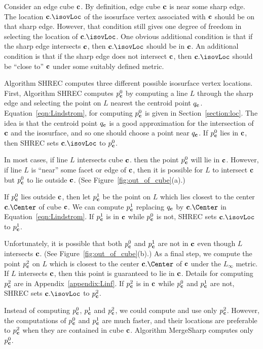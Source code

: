 Consider an edge cube $\mathbf{c}$.
By definition, edge cube $\mathbf{c}$ is near some sharp edge.
The location $\cb.\isovLoc$ of the isosurface vertex associated with $\mathbf{c}$ 
should be on that sharp edge.
However, that condition still gives one degree of freedom in selecting
the location of $\cb.\isovLoc$.
One obvious additional condition is that if the sharp edge intersects $\mathbf{c}$,
then $\cb.\isovLoc$ should be in $\mathbf{c}$.
An additional condition is that if the sharp edge does not intersect $\mathbf{c}$,
then $\cb.\isovLoc$ should be ``close to'' $\mathbf{c}$ 
under some suitably defined metric.

Algorithm SHREC computes three different possible isosurface vertex locations.
First, Algorithm SHREC computes $p^0_{\mathbf{c}}$ 
by computing a line $L$ through the sharp edge and 
selecting the point on $L$ nearest the centroid point $q_{\mathbf{c}}$.
Equation~\ref{eqn:Lindstrom}, for computing $p^0_{\mathbf{c}}$ is given
in Section~\ref{section:loc}.
The idea is that the centroid point $q_{\mathbf{c}}$ is a good approximation
for the intersection of $\mathbf{c}$ and the isosurface,
and so one should choose a point near $q_{\mathbf{c}}$.
If $p^0_{\mathbf{c}}$ lies in $\mathbf{c}$, then SHREC sets $\cb.\isovLoc$ to $p^0_{\mathbf{c}}$.

In most cases, if line $L$ intersects cube $\mathbf{c}$.
then the point $p^0_{\mathbf{c}}$ will lie in $\mathbf{c}$.
However, if line $L$ is ``near'' some facet or edge of $\mathbf{c}$,
then it is possible for $L$ to intersect $\mathbf{c}$ but $p^0_{\mathbf{c}}$ to lie
outside $\mathbf{c}$.
(See Figure~\ref{fig:out_of_cube}(a).)

If $p^0_{\mathbf{c}}$ lies outside $\mathbf{c}$,
then let $p^1_{\mathbf{c}}$ be the point on $L$ which lies closest 
to the center $\cb.\Center$ of cube $\mathbf{c}$.
We can compute $p^1_{\mathbf{c}}$ replacing $q_{\mathbf{c}}$ by $\cb.\Center$
in Equation~\ref{eqn:Lindstrom}.
If $p^1_{\mathbf{c}}$ is in $\mathbf{c}$ while $p^0_{\mathbf{c}}$ is not,
SHREC sets $\cb.\isovLoc$ to $p^1_{\mathbf{c}}$.

Unfortunately, it is possible that both $p^0_{\mathbf{c}}$ and $p^1_{\mathbf{c}}$ 
are not in $\mathbf{c}$ even though $L$ intersects $\mathbf{c}$.
(See Figure~\ref{fig:out_of_cube}(b).)
As a final step, we compute the point $p^2_{\mathbf{c}}$ on $L$ which is closest 
to the center $\cb.\Center$ of $\mathbf{c}$ under the $L_\infty$ metric.
If $L$ intersects $\mathbf{c}$, then this point is guaranteed to lie in $\mathbf{c}$.
Details for computing $p^2_{\mathbf{c}}$ are in Appendix~\ref{appendix:Linf}.
If $p^2_{\mathbf{c}}$ is in $\mathbf{c}$ while $p^0_{\mathbf{c}}$ and $p^1_{\mathbf{c}}$ are not,
SHREC sets $\cb.\isovLoc$ to $p^2_{\mathbf{c}}$.

Instead of computing $p^0_{\mathbf{c}}$, $p^1_{\mathbf{c}}$ and $p^2_{\mathbf{c}}$, 
we could compute and use only $p^2_{\mathbf{c}}$.
However, the computations of $p^0_{\mathbf{c}}$ and $p^1_{\mathbf{c}}$ are much faster,
and their locations are preferable to $p^2_{\mathbf{c}}$ when they are
contained in cube $\mathbf{c}$.
Algorithm MergeSharp computes only $p^0_{\mathbf{c}}$.

